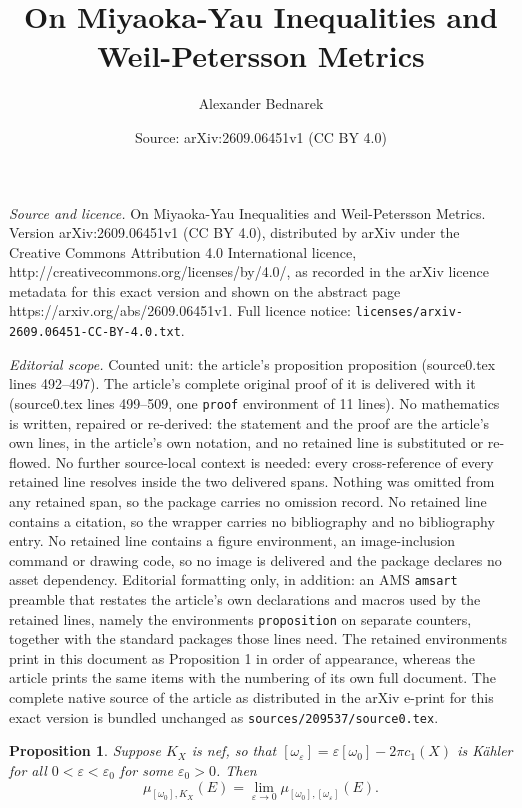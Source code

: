 \documentclass[10pt,a4paper]{amsart}
\title{On Miyaoka-Yau Inequalities and Weil-Petersson Metrics}
\author{Alexander Bednarek}
\date{Source: arXiv:2609.06451v1 (CC BY 4.0)}
\newtheorem{proposition}{Proposition}
\newcommand{\e}{\varepsilon}
\begin{document}
\maketitle

\noindent\emph{Source and licence.} On Miyaoka-Yau Inequalities and Weil-Petersson Metrics. Version arXiv:2609.06451v1 (CC BY 4.0), distributed by arXiv under the Creative Commons Attribution 4.0 International licence, http://creativecommons.org/licenses/by/4.0/, as recorded in the arXiv licence metadata for this exact version and shown on the abstract page https://arxiv.org/abs/2609.06451v1. Full licence notice: \texttt{licenses/arxiv-2609.06451-CC-BY-4.0.txt}.\par\smallskip

\noindent\textit{Editorial scope.} Counted unit: the article's proposition proposition (source0.tex lines 492--497). The article's complete original proof of it is delivered with it (source0.tex lines 499--509, one \texttt{proof} environment of 11 lines). No mathematics is written, repaired or re-derived: the statement and the proof are the article's own lines, in the article's own notation, and no retained line is substituted or re-flowed.  No further source-local context is needed: every cross-reference of every retained line resolves inside the two delivered spans.  Nothing was omitted from any retained span, so the package carries no omission record.  No retained line contains a citation, so the wrapper carries no bibliography and no bibliography entry.  No retained line contains a figure environment, an image-inclusion command or drawing code, so no image is delivered and the package declares no asset dependency.  Editorial formatting only, in addition: an AMS \texttt{amsart} preamble that restates the article's own declarations and macros used by the retained lines, namely the environments \texttt{proposition} on separate counters, together with the standard packages those lines need.  The retained environments print in this document as Proposition 1 in order of appearance, whereas the article prints the same items with the numbering of its own full document.  The complete native source of the article as distributed in the arXiv e-print for this exact version is bundled unchanged as \texttt{sources/209537/source0.tex}.
\begin{proposition}
Suppose $K_X$ is nef, so that $[\omega_{\e}] = \e[\omega_0] - 2 \pi c_1(X)$ is K\"ahler for all $0 < \e < \e_0$ for some $\e_0 > 0$. Then
\begin{equation*}
    \mu_{[\omega_0], K_X}(E) = \lim_{\e \to 0} \mu_{[\omega_0], [\omega_\e]}(E).
\end{equation*}
\end{proposition}
\end{document}
